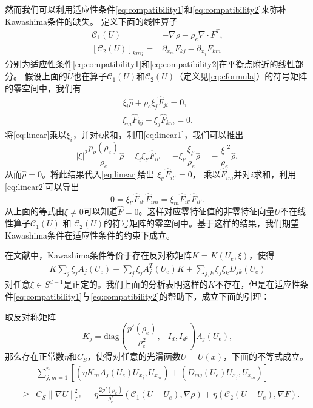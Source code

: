 然而我们可以利用适应性条件\eqref{eq:compatibility1}和\eqref{eq:compatibility2}来弥补Kawashima条件的缺失。
定义下面的线性算子
 \begin{eqnarray}\label{eq:cformula}
 {\mathcal C}_1(U) = & -\nabla\rho - \rho_e \nabla\cdot F^T, \nonumber \\
 {[{\mathcal C}_2(U)]}_{kmj} = & \partial_{x_m} F_{kj} - \partial_{x_j} F_{km}
 \end{eqnarray}
分别为适应性条件\eqref{eq:compatibility1}和\eqref{eq:compatibility2}在平衡点附近的线性部分。
假设上面的$\hat{U}$也在算子${\mathcal C}_1(U)$和${\mathcal C}_2(U)$（定义见\eqref{eq:cformula}）的符号矩阵的零空间中，我们有
\begin{eqnarray}
\xi_i \hat{\rho} + \rho_e \xi_{j} \hat{F}_{ji} = 0 , \label{eq:linear1}\\
\xi_{m} \hat{F}_{kj} - \xi_{j} \hat{F}_{km} =0. \label{eq:linear2}
\end{eqnarray}
将\eqref{eq:linear}乘以$\xi_i$，并对$i$求和，利用\eqref{eq:linear1}，我们可以推出
$$
|\xi|^2 \frac{p_\rho(\rho_e)}{\rho_e} \hat{\rho}  =  \xi_i \xi_{l'} \hat{F}_{il'}  = - \xi_{l'} \frac{\xi_{l'}  }{\rho_e} \hat{\rho} = -\frac{|\xi|^2}{\rho_e} \hat{\rho},
$$
从而$\hat{\rho}=0$。将此结果代入\eqref{eq:linear}给出
 $\xi_{l'} \hat{F}_{il'} = 0 $，
乘以$\hat{F}_{im}$并对$i$求和，利用\eqref{eq:linear2}可以导出
$$0=\xi_{l'} \hat{F} _{il'} \hat{F}_{im} = \xi_m \hat{F} _{il'}\hat{F} _{il'}.$$
从上面的等式由$\xi \neq 0$可以知道$\hat{F}=0$。这样对应零特征值的非零特征向量$U$不在线性算子${\mathcal C}_1(U)$ 和 ${\mathcal C}_2(U)$的符号矩阵的零空间中。基于这样的结果，我们期望Kawashima条件在适应性条件的约束下成立。

在文献\cite{shizuta1985systems}中，Kawashima条件等价于存在反对称矩阵$K=K(U_e, \xi)$，使得
\begin{eqnarray*}
  K\sum_{j}\xi_j A_j(U_e) - \sum_{j}\xi_j A_j^T(U_e)K + \sum_{j, k}\xi_j\xi_kD_{jk}(U_e)
\end{eqnarray*}
对任意$\xi\in S^{d-1}$是正定的。我们上面的分析表明这样的$K$不存在，但是在适应性条件\eqref{eq:compatibility1}与\eqref{eq:compatibility2}的帮助下，成立下面的引理：
\begin{lemma}\label{lemmaK}
取反对称矩阵
$$
K_j = \mbox{diag}\left(\frac{p'(\rho_e)}{\rho_e^2}, -I_d, I_{d^2}\right)A_j(U_e),
$$
那么存在正常数$\eta$和$C_S$，使得对任意的光滑函数$U =U(x)$，下面的不等式成立。
\begin{eqnarray}\label{eq:prop}
  &&\sum_{j,m=1}^n [( \eta K_m A_j(U_e) U_{x_j},U_{x_m}) + (D_{mj}(U_e) U_{x_j},U_{x_m})]\nonumber \\
  &\ge& C_S \|\nabla U \|_{L^2}^2 +\eta\frac{2p'(\rho_e)}{\rho_e^2}({\mathcal C}_1(U - U_e), \nabla \rho) + \eta({\mathcal C}_2(U - U_e), \nabla F).
\end{eqnarray}

\end{lemma}

